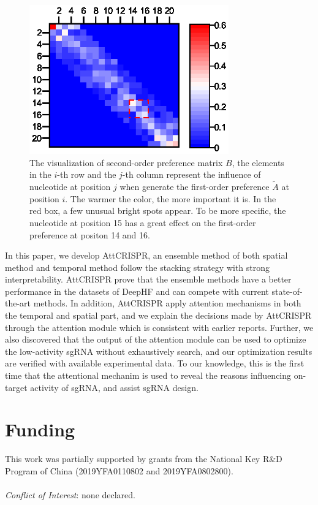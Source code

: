 \documentclass{bioinfo}
\begin{document}
\begin{figure}[!tpb]
    \centerline{\includegraphics[width=86mm]{secondorder.eps}}
    \caption{The visualization of second-order preference matrix $B$, 
the elements in the $i$-th row and the $j$-th column represent the influence of nucleotide at position $j$ when generate the first-order preference $\tilde{A}$ at position $i$. 
The warmer the color, the more important it is. 
In the red box, a few unusual bright spots appear. 
To be more specific, the nucleotide at position 15 has a great effect on the first-order preference at positon 14 and 16.
}\label{fig:heatmap}
\end{figure}
In this paper, we develop AttCRISPR, an ensemble method of both spatial method and temporal method follow the stacking strategy with strong interpretability. 
AttCRISPR prove that the ensemble methods have a better performance in the datasets of DeepHF
and can compete with current state-of-the-art methods. 
In addition, AttCRISPR apply attention mechanisms in both the temporal and spatial part, 
and we explain the decisions made by AttCRISPR through the attention module which is consistent with earlier reports. 
Further, we also discovered that the output of the attention module can be used to optimize the low-activity sgRNA without exhaustively search, 
and our optimization results are verified with available experimental data. 
To our knowledge, this is the first time that the attentional mechanim is used to reveal the reasons influencing on-target activity of sgRNA, and assist sgRNA design.  


\section*{Funding}

This work was partially supported by grants from the National Key R\&D Program of China (2019YFA0110802 and 2019YFA0802800).
\\\\\emph{Conflict of Interest}: none declared.\vspace*{-12pt}



\end{document}
